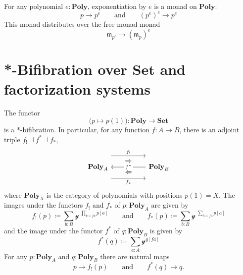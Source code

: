 \documentclass[11pt, one side, article]{memoir}
\theoremstyle{definition}
\theoremstyle{plain}
\newcommand{\Cat}[1]{\mathbf{#1}}%
\newcommand{\smset}{\Cat{Set}}
\newcommand{\yon}{\mathcal{y}}
\newcommand{\poly}{\Cat{Poly}}
\newcommand{\0}{\textsf{0}}
\newcommand{\1}{\tn{\textsf{1}}}
\newcommand{\free}{\mathfrak{m}}
\newcommand{\qqand}{\qquad\text{and}\qquad}
\begin{document}
For any polynomial $e:\poly$, exponentiation by $e$ is a monad on $\poly$:
\begin{equation}
	p\to p^e
	\qqand
	(p^e)^e\to p^e
\end{equation}
This monad distributes over the free monad monad
\begin{equation}
	\free_{p^e}\to(\free_p)^e
\end{equation}



\chapter{*-Bifibration over $\smset$ and factorization systems}\label{chap.bifib}

The functor
\begin{equation}\label{eqn.bifib}
\big(p\mapsto p(1)\big)\colon\poly\to\smset
\end{equation}
is a *-bifibration. In particular, for any function $f\colon A\to B$, there is an adjoint triple $f_!\dashv f^*\dashv f_*$,
\begin{equation}
\begin{tikzcd}[column sep=50pt]
	\poly_A
		\ar[r, shift left=16pt, "f_!"]
		\ar[r, shift right=16pt, "f_*"']
		\ar[from=r, "f^*" description]
		\ar[r, phantom, shift left=8pt, "\Rightarrow"]
		\ar[r, phantom, shift right=8pt, "\Leftarrow"]
	&
	\poly_B
\end{tikzcd}
\end{equation}
where $\poly_X$ is the category of polynomials with positions $p(1)=X$. The images under the functors $f_!$ and $f_*$ of $p:\poly_A$ are given by
\begin{equation}
	f_!(p)\coloneqq\sum_{b: B}\yon^{\;\prod\limits_{b=fa}p[a]}
	\qqand
	f_*(p)\coloneqq\sum_{b: B}\yon^{\;\sum\limits_{b=fa}p[a]}
\end{equation}
and the image under the functor $f^*$ of $q:\poly_B$ is given by
\begin{equation}
	f^*(q)\coloneqq\sum_{a: A}\yon^{q[fa]}
\end{equation}
For any $p:\poly_A$ and $q:\poly_B$ there are natural maps
\begin{equation}
	p\to f_!(p)
	\qqand
	f^*(q)\to q.
\end{equation}
\end{document}
